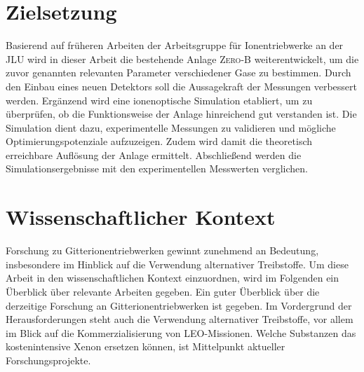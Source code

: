 \section{Zielsetzung}
Basierend auf früheren Arbeiten der Arbeitsgruppe für Ionentriebwerke an der JLU wird in dieser Arbeit die bestehende Anlage \textsc{Zero-B} weiterentwickelt, um die zuvor genannten relevanten Parameter verschiedener Gase zu bestimmen. Durch den Einbau eines neuen Detektors soll die Aussagekraft der Messungen verbessert werden. Ergänzend wird eine ionenoptische Simulation etabliert, um zu überprüfen, ob die Funktionsweise der Anlage hinreichend gut verstanden ist. Die Simulation dient dazu, experimentelle Messungen zu validieren und mögliche Optimierungspotenziale aufzuzeigen. Zudem wird damit die theoretisch erreichbare Auflösung der Anlage ermittelt. Abschließend werden die Simulationsergebnisse mit den experimentellen Messwerten verglichen.

\section{Wissenschaftlicher Kontext}
Forschung zu Gitterionentriebwerken gewinnt zunehmend an Bedeutung, insbesondere im Hinblick auf die Verwendung alternativer Treibstoffe. Um diese Arbeit in den wissenschaftlichen Kontext einzuordnen, wird im Folgenden ein Überblick über relevante Arbeiten gegeben. Ein guter Überblick über die derzeitige Forschung an Gitterionentriebwerken ist \cite{ion} gegeben. Im Vordergrund der Herausforderungen steht auch die Verwendung alternativer Treibstoffe, vor allem im Blick auf die Kommerzialisierung von LEO-Missionen. Welche Substanzen das kostenintensive Xenon ersetzen können, ist Mittelpunkt aktueller Forschungsprojekte.
 
